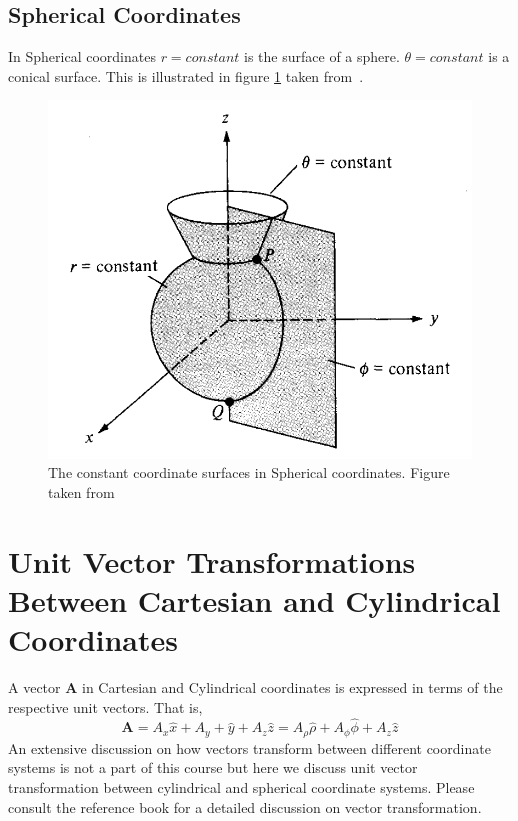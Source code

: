 \documentclass[12pt,a4paper]{article}
\begin{document}
\subsection{Spherical Coordinates}
In Spherical coordinates $r=constant$ is the surface of a sphere. $\theta=constant$ is a conical surface. This is illustrated in figure \ref{Spherical-constant} taken from~\cite[Figure 2.9, page 43]{Sadiku}.
\begin{figure}[H]
\centering
\includegraphics[scale=0.4]{Figure2-9S.png}
\caption{The constant coordinate surfaces in Spherical coordinates. Figure taken from~\cite[Figure 2.9, page 43]{Sadiku}}
\label{Spherical-constant}
\end{figure}
\section{Unit Vector Transformations Between Cartesian and Cylindrical Coordinates}
A vector \textbf{A} in Cartesian and Cylindrical coordinates is expressed in terms of the respective unit vectors. That is,
\begin{equation}
\textbf{A}=A_x\hat x+A_y+\hat y+A_z\hat z=A_{\rho}\hat \rho+A_{\phi}\hat \phi+A_z\hat z
\end{equation}
An extensive discussion on how vectors transform between different coordinate systems is not a part of this course but here we discuss unit vector transformation between cylindrical and spherical coordinate systems. Please consult the reference book \cite[Chapter 2]{Sadiku} for a detailed discussion on vector transformation.
\end{document}
